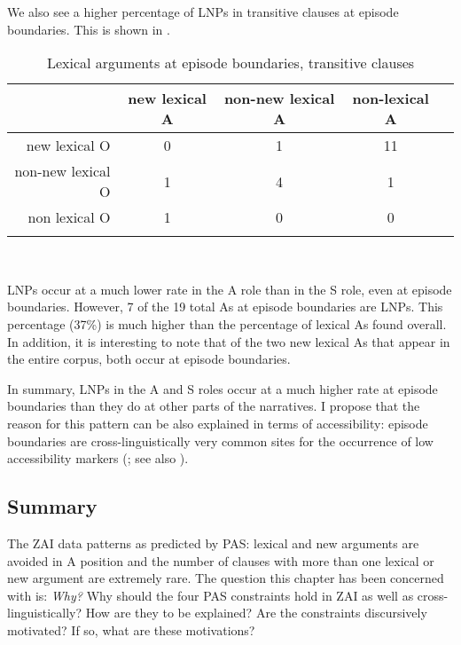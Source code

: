 We also see a higher percentage of LNPs in transitive clauses at episode boundaries. This is shown in .
\begin{table}

\caption{{Lexical arguments at episode boundaries, transitive clauses}}
\begin{tabular}{ r  c  c  c  c }
\lsptoprule
 & new lexical A & non-new lexical A & non-lexical A \\

\midrule
new lexical O & 0 & 1 & 11 \\

\midrule
non-new lexical O & 1 & 4  & 1  \\

\midrule
non lexical O & 1 &  0 & 0  \\

\lspbottomrule
\end{tabular}\\
\label{episodetr}

\end{table}
LNPs occur at a much lower rate in the A role than in the S role, even at episode boundaries. However, 7 of the 19 total As at episode boundaries are LNPs. This percentage (37{\%}) is much higher than the percentage of lexical As found overall. In addition, it is interesting to note that of the two new lexical As that appear in the entire corpus, both occur at episode boundaries. 

In summary, LNPs in the A and S roles occur at a much higher rate at episode boundaries than they do at other parts of the narratives. I propose that the reason for this pattern can be also explained in terms of accessibility: episode boundaries are cross-linguistically very common sites for the occurrence of low accessibility markers (\citealt[52]{ariel2001}; see also \citealt{downing1980}).


\subsection{Summary}\label{discussion}

The ZAI data patterns as predicted by PAS: lexical and new arguments are avoided in A position and the number of clauses with more than one lexical or new argument are extremely rare. The question this chapter has been concerned with is: \textit{Why?} Why should the four PAS constraints hold in ZAI as well as cross-linguistically? How are they to be explained? Are the constraints discursively motivated? If so, what are these motivations? 

